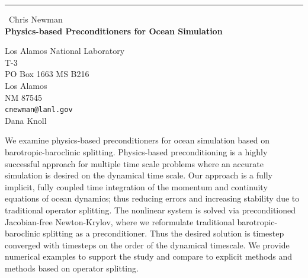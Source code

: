 \documentclass{report}
\begin{document}
\begin{center}
\rule{6in}{1pt} \
{\large Chris Newman \\
{\bf Physics-based Preconditioners for Ocean Simulation}}

Los Alamos National Laboratory \\ T-3 \\ PO Box 1663 MS B216 \\ Los Alamos \\ NM 87545
\\
{\tt cnewman@lanl.gov}\\
Dana Knoll\end{center}

We examine physics-based preconditioners for ocean simulation based on
barotropic-baroclinic splitting. Physics-based preconditioning is a
highly successful approach for multiple time scale problems where an
accurate simulation is desired on the dynamical time scale. Our approach
is a fully implicit, fully coupled time integration of the momentum and
continuity equations of ocean dynamics; thus reducing errors and
increasing stability due to traditional operator splitting. The nonlinear
system is solved via preconditioned Jacobian-free Newton-Krylov, where we
reformulate traditional barotropic-baroclinic splitting as a
preconditioner. Thus the desired solution is timestep converged with
timesteps on the order of the dynamical timescale. We provide numerical
examples to support the study and compare to explicit methods and methods
based on operator splitting.
\end{document}
